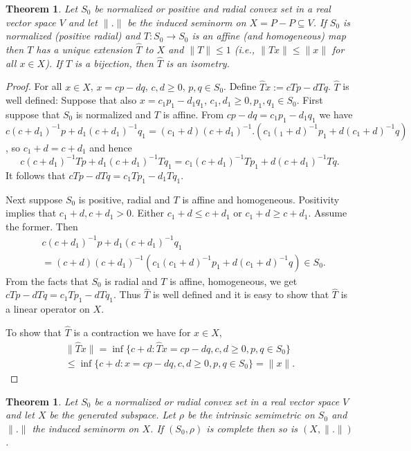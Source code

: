 \documentclass[12pt,letterpaper]{article}
\newtheorem{theorem}[lemma]{Theorem}
\begin{document}
\begin{theorem}\label{th:extension} Let $S_0$ be normalized or positive and radial convex set in a real vector space $V$ and let $\|.\|$ be the induced seminorm
on $X=P-P\subseteq V$. If $S_0$ is normalized (positive radial) and $T:S_0 \to S_0$ is an affine (and homogeneous) map then $T$ has a unique extension $\hat{T}$ to $X$ and $\|T\|\leq 1$ (i.e., $\|Tx\|\leq \|x\|$ for all $x\in X$). If $T$ is a bijection, then $\hat{T}$ is an isometry.
\end{theorem}

\begin{proof} For all $x\in X$, $x=cp-dq$, $c,d\geq 0$, $p,q\in S_0$. Define $\hat{T}x:=cTp-dTq$. $\hat{T}$ is well defined: Suppose that also $x=c_1p_1-d_1q_1$, $c_1,d_1\geq 0, p_1,q_1\in S_0$. First suppose that $S_0$ is normalized and $T$ is affine. From $cp-dq=c_1p_1-d_1q_1$ we have $c(c+d_1)^{-1}p+d_1(c+d_1)^{-1}q_1=(c_1+d)(c+d_1)^{-1}.(c_1(_1+d)^{-1}p_1+d(c_1+d)^{-1}q)$, so $c_1+d=c+d_1$ and hence
\[
c(c+d_1)^{-1}Tp+d_1(c+d_1)^{-1}Tq_1=c_1(c+d_1)^{-1}Tp_1+d(c+d_1)^{-1}Tq.
\]
It follows that $cTp-dTq=c_1Tp_1-d_1Tq_1$.

Next suppose  $S_0$ is positive, radial and $T$ is affine and homogeneous. Positivity implies that $c_1+d, c+d_1 > 0$.  Either $c_1+d\leq c+d_1$ or $c_1+d\geq c+d_1$.
Assume the former. Then
\begin{eqnarray*}
&c(c+d_1)^{-1}p+d_1(c+d_1)^{-1}q_1\\
 &=(c+d)(c+d_1)^{-1}(c_1(c_1+d)^{-1}p_1+d(c_1+d)^{-1}q)\in S_0.
\end{eqnarray*}
From the facts that $S_0$ is radial and $T$ is affine, homogeneous, we get $cTp-dTq=c_1Tp_1-dTq_1$.
Thus $\hat{T}$ is well defined and it is easy to show that $\hat{T}$ is a linear operator on $X$.

To show that $\hat{T}$ is a contraction we have for $x\in X$,
\begin{eqnarray*}
\|\hat{T}x\|=\inf\{ c+d: \hat{T}x=cp-dq, c,d\geq 0, p,q\in S_0\}\\
\leq \inf\{ c+d: x=cp-dq, c,d\geq 0, p,q\in S_0\}=\|x\|.
\end{eqnarray*}
\end{proof}

\begin{theorem}\label{th3.7} Let $S_0$ be a normalized or radial convex set in a real vector space $V$ and let $X$ be the generated subspace. Let $\rho$ be the intrinsic semimetric on $S_0$ and $\|.\|$ the induced seminorm on $X$.  If $(S_0,\rho)$ is complete then so is $(X,\|.\|)$.
\end{theorem}
\end{document}
